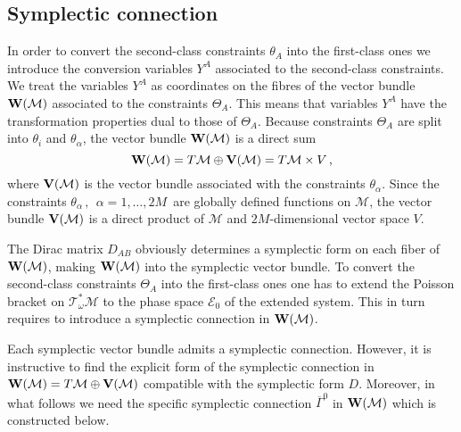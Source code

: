 \documentclass[a4paper,11pt]{amsart}
\numberwithin{thm}{section} %
\numberwithin{equation}{section} %
\numberwithin{figure}{section} %
\renewcommand{\:}{{\rm\, :\,}}
\def\bar{\overline}
\def\mod{{\mathcal T}^*_\omega}
\def\manM{{\mathcal M}}
\def\E{{ \mathcal E}}
\def\V{{\bf V}}
\def\W{{\bf W}}
\def\con{{\bar\Gamma}}
\begin{document}
\subsection{Symplectic connection}\label{subsec:connection}
In order to convert the second-class constraints $\theta_A$ into
the first-class ones we introduce the conversion variables $Y^A$
associated to the second-class constraints.  We treat
the variables $Y^A$ as coordinates on the fibres of the
vector bundle $\W(\manM)$ associated to the constraints
$\Theta_A$.  This means that variables $Y^A$ have the transformation
properties dual to those of $\Theta_A$.  Because constraints $\Theta_A$
are split into $\theta_i$ and $\theta_\alpha$, the vector bundle
$\W(\manM)$ is a direct sum
\begin{equation}
\W(\manM)=T\manM\oplus \V(\manM)=T\manM \times V\,,
\end{equation}
where $\V(\manM)$ is the vector bundle associated with the constraints
$\theta_\alpha$.  Since the constraints
$\theta_\alpha\,,~~\alpha=1,\ldots,2M\,$
are globally defined functions on $\manM$, the vector bundle
$\V(\manM)$ is a direct product of $\manM$ and $2M$-dimensional
vector space $V$.

The Dirac matrix $D_{AB}$ obviously determines a symplectic form on
each fiber of $\W(\manM)$, making $\W(\manM)$ into the symplectic
vector bundle.  To convert the second-class constraints $\Theta_A$
into the first-class ones one has to extend the Poisson bracket on
$\mod\manM$ to the phase space $\E_0$ of the extended system.  This
in turn requires to introduce a symplectic connection in $\W(\manM)$.

Each symplectic vector bundle admits a symplectic connection. However,
it is instructive to find the explicit form of the symplectic
connection in $\W(\manM)=T\manM\oplus \V(\manM)$ compatible with
the symplectic form $D$.  Moreover, in what follows we need
the specific symplectic connection $\con^0$ in $\W(\manM)$
which is constructed below.
\end{document}
